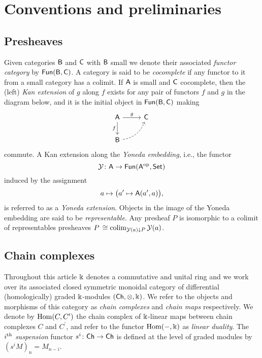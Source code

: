 
\section{Conventions and preliminaries}\label{s:preliminaries}

\subsection{Presheaves}

Given categories $\mathsf{B}$ and $\mathsf{C}$ with $\mathsf{B}$ small we denote their associated \textit{functor category} by $\mathsf{Fun}(\mathsf{B}, \mathsf{C})$.
A category is said to be \textit{cocomplete} if any functor to it from a small category has a colimit.
If $\mathsf{A}$ is small and $\mathsf{C}$ cocomplete, then the (left) \textit{Kan extension} of $g$ along $f$ exists for any pair of functors $f$ and $g$ in the diagram below, and it is the initial object in $\mathsf{Fun}(\mathsf{B}, \mathsf{C})$ making
\begin{equation*}
	\begin{tikzcd}[column sep=normal, row sep=normal]
		\sA \arrow[d, "f"'] \arrow[r, "g"] & \sC \\
		\sB \arrow[dashed, ur, bend right] & \quad
	\end{tikzcd}
\end{equation*}
commute.
A Kan extension along the \textit{Yoneda embedding}, i.e., the functor
\[
\operatorname{\mathcal{Y}} \colon \mathsf{A} \to \mathsf{Fun}(\mathsf{A}^{\mathrm{op}}, \mathsf{Set})
\]
induced by the assignment
\[
a \mapsto \big( a^\prime \mapsto \mathsf{A}(a^\prime, a) \big),
\]
is referred to as a \textit{Yoneda extension}.
Objects in the image of the Yoneda embedding are said to be \textit{representable}.
Any presheaf $P$ is isomorphic to a colimit of representables presheaves $P \, \cong \operatorname*{colim}_{\operatorname{\mathcal{Y}}(a) \downarrow P} \operatorname{\mathcal{Y}}(a)$.

\subsection{Chain complexes}

Throughout this article $\Bbbk$ denotes a commutative and unital ring and we work over its associated closed symmetric monoidal category of differential (homologically) graded $\Bbbk$-modules $(\mathsf{Ch}, \otimes, \Bbbk)$.
We refer to the objects and morphisms of this category as \textit{chain complexes} and \textit{chain maps} respectively.
We denote by $\mathrm{Hom}(C, C^\prime)$ the chain complex of $\Bbbk$-linear maps between chain complexes $C$ and $C^\prime$, and refer to the functor $\mathrm{Hom}(-, \Bbbk)$ as \textit{linear duality}.
The $i^{\mathrm{th}}$ \textit{suspension} functor $s^i \colon \mathsf{Ch} \to \mathsf{Ch}$ is defined at the level of graded modules by $(s^{i}M)_n = M_{n-i}$.

